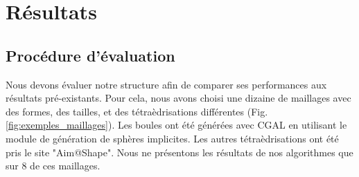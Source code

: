 \section{Résultats}
\subsection{Procédure d'évaluation}
\noindent
Nous devons évaluer notre structure afin de comparer ses performances aux résultats pré-existants. Pour cela, nous avons choisi une dizaine de maillages avec des formes, des tailles, et des tétraèdrisations différentes (Fig. \ref{fig:exemples_maillages}). Les boules ont été générées avec CGAL \cite{CGAL} en utilisant le module de génération de sphères implicites. Les autres tétraèdrisations ont été pris le site "Aim@Shape". Nous ne présentons les résultats de nos algorithmes que sur 8 de ces maillages.
